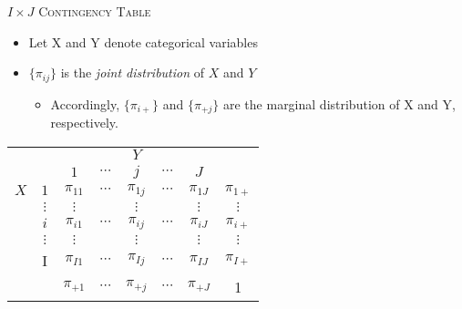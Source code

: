 \documentclass[dvipdfmx, serif,handout]{beamer}
\begin{document}
\begin{frame}{\textsc{$I \times J$ Contingency Table}}
	\begin{itemize}
		\item Let X and Y denote categorical variables
		\item $\{\pi_{ij}\}$ is the {\it joint distribution} of $X$ and $Y$
		      \begin{itemize}
			      \item  Accordingly,  $\{\pi_{i+}\}$ and $\{\pi_{+j}\}$ are the marginal distribution of X and Y, respectively.
		      \end{itemize}
	\end{itemize}

	\centering
	\begin{tabular}{cc|ccccc|c}
		\hline
		    &          & \multicolumn{5}{c|}{$Y$} &                                                                    \\
		    &          & {$1$}                    & {$\cdots$} & {$j$}        & {$\cdots$} & {$J$}        &            \\\hline
		$X$ & $1$      & $\pi_{11}$               & $\cdots$   & $\pi_{1j}$   & $\cdots$   & $\pi_{1J}$   & $\pi_{1+}$ \\
		    & $\vdots$ & $\vdots$                 &            & $\vdots$     &            & $\vdots$     & $\vdots$   \\
		    & {$i$}    & {$\pi_{i1}$}             & {$\cdots$} & {$\pi_{ij}$} & {$\cdots$} & {$\pi_{iJ}$} & $\pi_{i+}$ \\
		    & $\vdots$ & $\vdots$                 &            & $\vdots$     &            & $\vdots$     & $\vdots$   \\
		    & I        & $\pi_{I1}$               & $\cdots$   & $\pi_{Ij}$   & $\cdots$   & $\pi_{IJ}$   & $\pi_{I+}$ \\\hline
		    &          & $\pi_{+1}$               & $\cdots$   & $\pi_{+j}$   & $\cdots$   & $\pi_{+J}$   & 1          \\
	\end{tabular}
\end{frame}
\end{document}
